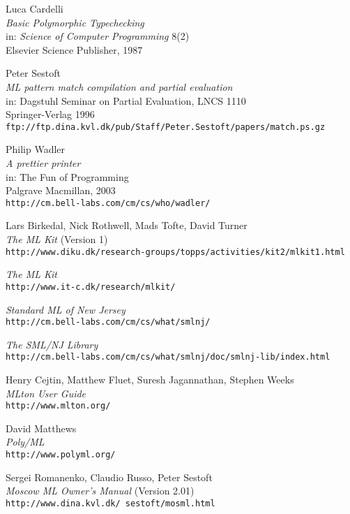 \documentclass[twoside,titlepage]{article}
\begin{document}
\begin{appendix}
\begin{thebibliography}{MTHM97}
Luca Cardelli \\
{\it Basic Polymorphic Typechecking} \\
in: {\it Science of Computer Programming} 8(2) \\
Elsevier Science Publisher, 1987

Peter Sestoft \\
{\it ML pattern match compilation and partial evaluation} \\
in: Dagstuhl Seminar on Partial Evaluation, LNCS 1110 \\
Springer-Verlag 1996 \\
{\small\tt{ftp://ftp.dina.kvl.dk/pub/Staff/Peter.Sestoft/papers/match.ps.gz}}

Philip Wadler \\
{\it A prettier printer} \\
in: The Fun of Programming \\
Palgrave Macmillan, 2003 \\
{\small\tt{http://cm.bell-labs.com/cm/cs/who/wadler/}}

Lars Birkedal, Nick Rothwell, Mads Tofte, David Turner \\
{\it The ML Kit} (Version 1) \\
{\small\tt{http://www.diku.dk/research-groups/topps/activities/kit2/mlkit1.html}}

{\it The ML Kit} \\
{\small\tt{http://www.it-c.dk/research/mlkit/}}

{\it Standard ML of New Jersey} \\
{\small\tt{http://cm.bell-labs.com/cm/cs/what/smlnj/}}

{\it The SML/NJ Library} \\
{\small\tt{http://cm.bell-labs.com/cm/cs/what/smlnj/doc/smlnj-lib/index.html}}

Henry Cejtin, Matthew Fluet, Suresh Jagannathan, Stephen Weeks \\
{\it MLton User Guide} \\
{\small\tt{http://www.mlton.org/}}

David Matthews \\
{\it Poly/ML} \\
{\small\tt{http://www.polyml.org/}}

Sergei Romanenko, Claudio Russo, Peter Sestoft \\
{\it Moscow ML Owner's Manual} (Version 2.01) \\
{\small\tt{http://www.dina.kvl.dk/~sestoft/mosml.html}}


\end{thebibliography}
\end{appendix}
\end{document}
